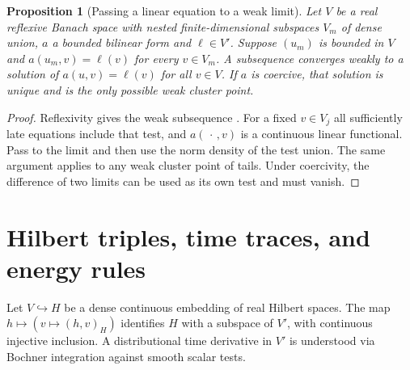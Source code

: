 \documentclass[11pt,oneside,openany]{book}
\theoremstyle{plain}
\newtheorem{proposition}[theorem]{Proposition}
\theoremstyle{definition}
\theoremstyle{remark}
\begin{document}
\begin{proposition}[Passing a linear equation to a weak limit]
\label{prop:pde-weak-galerkin}
Let \(V\) be a real reflexive Banach space with nested finite-dimensional
subspaces \(V_m\) of dense union, \(a\) a bounded bilinear form and
\(\ell\in V'\). Suppose \((u_m)\) is bounded in \(V\) and
\(a(u_m,v)=\ell(v)\) for every \(v\in V_m\).
A subsequence converges weakly to a solution of
\(a(u,v)=\ell(v)\) for all \(v\in V\). If \(a\) is coercive,
that solution is unique and is the only possible weak cluster point.
\end{proposition}
\begin{proof}
Reflexivity gives the weak subsequence
\cite[Chapter 3]{P106}. For a fixed \(v\in V_j\) all sufficiently
late equations include that test, and \(a(\,\cdot\,,v)\) is
a continuous linear functional. Pass to the limit and then use
the norm density of the test union. The same argument applies
to any weak cluster point of tails. Under coercivity, the difference
of two limits can be used as its own test and must vanish.
\end{proof}

\section{Hilbert triples, time traces, and energy rules}
\label{pde:C06}

Let \(V\hookrightarrow H\) be a dense continuous embedding of
real Hilbert spaces. The map \(h\mapsto(v\mapsto(h,v)_H)\)
identifies \(H\) with a subspace of \(V'\), with continuous
injective inclusion. A distributional time derivative in \(V'\)
is understood via Bochner integration against smooth scalar tests.
\end{document}
